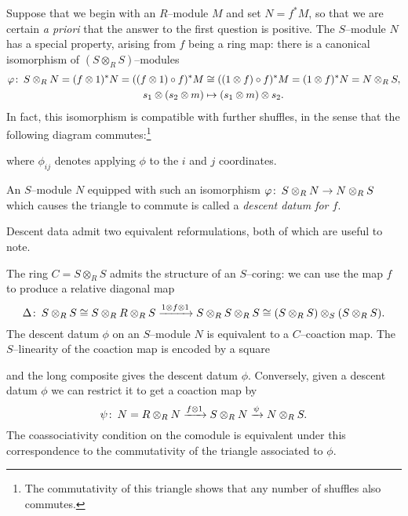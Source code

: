 Suppose that we begin with an $R$--module $M$ and set $N = f^* M$, so that we are certain \emph{a priori} that the answer to the first question is positive.  The $S$--module $N$ has a special property, arising from $f$ being a ring map: there is a canonical isomorphism of $(S \otimes_R S)$--modules
\begin{align*}
\varphi\colon\thinspace S \otimes_R N = (f \otimes 1)^* N = ((f \otimes 1) \circ f)^* M & \cong ((1 \otimes f) \circ f)^* M = (1 \otimes f)^* N = N \otimes_R S, \\
s_1 \otimes (s_2 \otimes m) & \mapsto (s_1 \otimes m) \otimes s_2.
\end{align*}
In fact, this isomorphism is compatible with further shuffles, in the sense that the following diagram commutes:\footnote{The commutativity of this triangle shows that any number of shuffles also commutes.}
\begin{center}
\end{center}
where $\phi_{ij}$ denotes applying $\phi$ to the $i${\th} and $j${\th} coordinates.

\begin{definition}
An $S$--module $N$ equipped with such an isomorphism $\varphi\colon\thinspace S \otimes_R N \to N \otimes_R S$ which causes the triangle to commute is called a \textit{descent datum for $f$}.
\end{definition}

Descent data admit two equivalent reformulations, both of which are useful to note.
\begin{remark}
The ring $C = S \otimes_R S$ admits the structure of an $S$--coring: we can use the map $f$ to produce a relative diagonal map \[\Delta\colon\thinspace S \otimes_R S \cong S \otimes_R R \otimes_R S \xrightarrow{1 \otimes f \otimes 1} S \otimes_R S \otimes_R S \cong (S \otimes_R S) \otimes_S (S \otimes_R S).\]  The descent datum $\phi$ on an $S$--module $N$ is equivalent to a $C$--coaction map.  The $S$--linearity of the coaction map is encoded by a square
\begin{center}
\end{center}
and the long composite gives the descent datum $\phi$.  Conversely, given a descent datum $\phi$ we can restrict it to get a coaction map by \[\psi\colon\thinspace N = R \otimes_R N \xrightarrow{f \otimes 1} S \otimes_R N \xrightarrow{\psi} N \otimes_R S.\]  The coassociativity condition on the comodule is equivalent under this correspondence to the commutativity of the triangle associated to $\phi$.
\end{remark}

